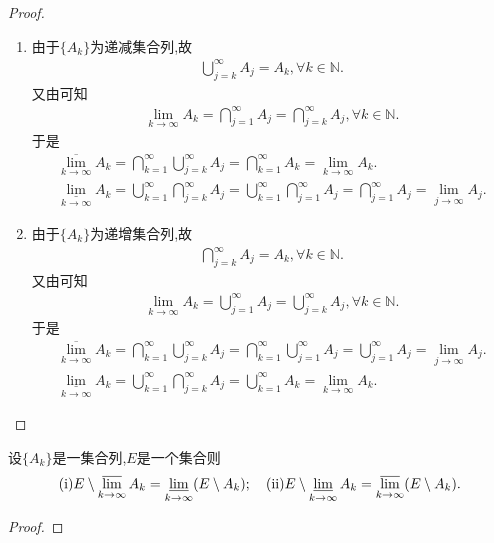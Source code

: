 \documentclass[../../main.tex]{subfiles}%
\begin{document}
\begin{proof}
\begin{enumerate}
\item 由于$\{A_k\}$为递减集合列,故
\begin{align*}
\bigcup_{j=k}^{\infty}{A_j}=A_k,\forall k\in \mathbb{N} .
\end{align*}
又由可知
\begin{align*}
\underset{k\rightarrow \infty}{\lim}A_k=\bigcap_{j=1}^{\infty}{A_j}=\bigcap_{j=k}^{\infty}{A_j},\forall k\in \mathbb{N} .
\end{align*}
于是
\begin{gather*}
\underset{k\rightarrow \infty}{\overline{\lim }}A_k=\bigcap_{k=1}^{\infty}{\bigcup_{j=k}^{\infty}{A_j}}=\bigcap_{k=1}^{\infty}{A_k}=\underset{k\rightarrow \infty}{\lim}A_k.
\\
\underset{k\rightarrow \infty}{\underline{\lim }}A_k=\bigcup_{k=1}^{\infty}{\bigcap_{j=k}^{\infty}{A_j}}=\bigcup_{k=1}^{\infty}{\bigcap_{j=1}^{\infty}{A_j}}=\bigcap_{j=1}^{\infty}{A_j}=\underset{j\rightarrow \infty}{\lim}A_j.
\end{gather*}

\item 由于$\{A_k\}$为递增集合列,故
\begin{align*}
\bigcap_{j=k}^{\infty}{A_j}=A_k,\forall k\in \mathbb{N} .
\end{align*}
又由可知
\begin{align*}
\underset{k\rightarrow \infty}{\lim}A_k=\bigcup_{j=1}^{\infty}{A_j}=\bigcup_{j=k}^{\infty}{A_j},\forall k\in \mathbb{N} .
\end{align*}
于是
\begin{gather*}
\underset{k\rightarrow \infty}{\overline{\lim }}A_k=\bigcap_{k=1}^{\infty}{\bigcup_{j=k}^{\infty}{A_j}}=\bigcap_{k=1}^{\infty}{\bigcup_{j=1}^{\infty}{A_j}}=\bigcup_{j=1}^{\infty}{A_j}=\underset{j\rightarrow \infty}{\lim}A_j.
\\
\underset{k\rightarrow \infty}{\underline{\lim }}A_k=\bigcup_{k=1}^{\infty}{\bigcap_{j=k}^{\infty}{A_j}}=\bigcup_{k=1}^{\infty}{A_k}=\underset{k\rightarrow \infty}{\lim}A_k.
\end{gather*}
\end{enumerate}

\end{proof}

\begin{proposition}[上、下极限集的性质]\label{proposition:上、下极限集的性质}
设\(\{A_k\}\)是一集合列,$E$是一个集合则
\begin{align*}
(\text{i}) E\setminus\varlimsup_{k\rightarrow\infty}A_k=\varliminf_{k\rightarrow\infty}(E\setminus A_k);\quad (\text{ii}) E\setminus\varliminf_{k\rightarrow\infty}A_k=\varlimsup_{k\rightarrow\infty}(E\setminus A_k).
\end{align*}
\end{proposition}
\begin{proof}



\end{proof}
\end{document}
